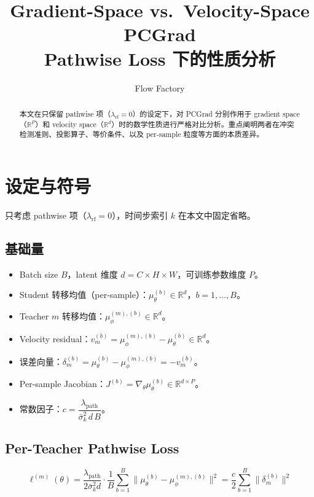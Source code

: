 \documentclass[11pt,a4paper]{article}
\title{\textbf{Gradient-Space vs.\ Velocity-Space PCGrad}\\[0.3em]
\large Pathwise Loss 下的性质分析}
\author{Flow Factory}
\date{}
\newcommand{\R}{\mathbb{R}}
\newcommand{\mutheta}{\mu_\theta}
\newcommand{\muphi}{\mu_\phi}
\newcommand{\sigbar}{\bar{\sigma}}
\newcommand{\lpath}{\lambda_{\mathrm{path}}}
\newcommand{\lrf}{\lambda_{\mathrm{rf}}}
\theoremstyle{definition}
\begin{document}
\maketitle

\begin{abstract}
本文在只保留 pathwise 项（$\lrf = 0$）的设定下，对 PCGrad 分别作用于 gradient space（$\R^P$）和 velocity space（$\R^d$）时的数学性质进行严格对比分析。重点阐明两者在冲突检测准则、投影算子、等价条件、以及 per-sample 粒度等方面的本质差异。
\end{abstract}

\tableofcontents
\newpage

\section{设定与符号}

只考虑 pathwise 项（$\lrf = 0$），时间步索引 $k$ 在本文中固定省略。

\subsection{基础量}

\begin{itemize}[leftmargin=1.5em]
\item Batch size $B$，latent 维度 $d = C\!\times\!H\!\times\!W$，可训练参数维度 $P$。
\item Student 转移均值（per-sample）：$\mutheta^{(b)} \in \R^d$，$b = 1,\ldots,B$。
\item Teacher $m$ 转移均值：$\muphi^{(m),(b)} \in \R^d$。
\item Velocity residual：$v_m^{(b)} = \muphi^{(m),(b)} - \mutheta^{(b)} \in \R^d$。
\item 误差向量：$\delta_m^{(b)} = \mutheta^{(b)} - \muphi^{(m),(b)} = -v_m^{(b)}$。
\item Per-sample Jacobian：$J^{(b)} = \nabla_\theta \mutheta^{(b)} \in \R^{d \times P}$。
\item 常数因子：$c = \dfrac{\lpath}{\sigbar_k^2\, d\, B}$。
\end{itemize}

\subsection{Per-Teacher Pathwise Loss}

\begin{equation}
\ell^{(m)}(\theta) = \frac{\lpath}{2\sigbar_k^2 d}\cdot\frac{1}{B}\sum_{b=1}^B \|\mutheta^{(b)} - \muphi^{(m),(b)}\|^2
= \frac{c}{2}\sum_{b=1}^B \|\delta_m^{(b)}\|^2
\label{eq:pathwise_loss}
\end{equation}
\end{document}
